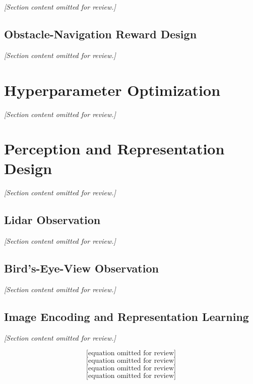 \textit{[Section content omitted for review.]}

\subsection{Obstacle-Navigation Reward Design}
\label{sec:obstacle_reward}
\textit{[Section content omitted for review.]}

\section{Hyperparameter Optimization}
\label{sec:hpo}
\textit{[Section content omitted for review.]}

\section{Perception and Representation Design}
\label{sec:perception}
\textit{[Section content omitted for review.]}

\subsection{Lidar Observation}
\textit{[Section content omitted for review.]}

\subsection{Bird's-Eye-View Observation}
\textit{[Section content omitted for review.]}

\subsection{Image Encoding and Representation Learning}
\textit{[Section content omitted for review.]}

\begin{equation}
\text{[equation omitted for review]}
\label{eq:scaled_cnn_features}
\end{equation}
\begin{equation}
\text{[equation omitted for review]}
\label{eq:state_scale_features}
\end{equation}
\begin{equation}
\text{[equation omitted for review]}
\label{eq:encoder}
\end{equation}
\begin{equation}
\text{[equation omitted for review]}
\label{eq:decoder}
\end{equation}

